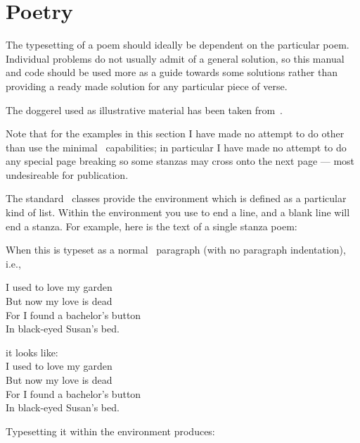 \chapter{Poetry} \label{chap:verse}


    The typesetting of a poem should ideally be dependent on the
particular poem. Individual problems do not usually admit of a
general solution, so this manual and code should be used more
as a guide towards some solutions rather than providing a ready
made solution for any particular piece of verse.

    The doggerel used as illustrative material has been taken 
from~\cite{RUMOUR}.

    Note that for the examples in this section I have made no attempt
to do other than use the minimal \alltx\ capabilities; in particular
I have made no attempt to do any special page breaking so some stanzas
may cross onto the next page --- most undesireable for publication.


    The standard \ltx\ classes provide the  environment which 
is defined as a particular kind of list. Within the environment you 
use \cmd{\\} to end a line, 
and a blank line will end a 
stanza. For example, here is the text of a single stanza poem:
\begin{lcode}
\newcommand{\garden}{
I used to love my garden \\
But now my love is dead \\
For I found a bachelor's button \\
In black-eyed Susan's bed.
}
\end{lcode}
\newcommand{\garden}{
I used to love my garden \\
But now my love is dead \\
For I found a bachelor's button \\
In black-eyed Susan's bed.
}
When this is typeset as a normal \ltx\ paragraph 
(with no paragraph indentation), i.e.,
\begin{lcode}
\noident\garden
\end{lcode}
it looks like: \\[\baselineskip]
\garden{}

\vspace*{\onelineskip}

   Typesetting it within the  environment produces:%

